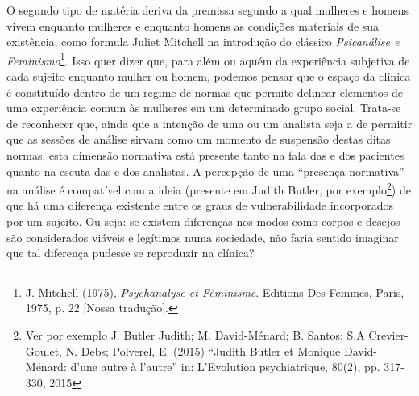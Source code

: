 O segundo tipo de matéria deriva da premissa segundo a qual mulheres e
homens vivem enquanto mulheres e enquanto homens as condições materiais
de sua existência, como formula Juliet Mitchell na introdução do
clássico \emph{Psicanálise e Feminismo}\footnote{J. Mitchell (1975),
  \emph{Psychanalyse et Féminisme}. Editions Des Femmes, Paris, 1975, p.
  22 {[}Nossa tradução{]}.}. Isso quer dizer que, para além ou aquém da
experiência subjetiva de cada sujeito enquanto mulher ou homem, podemos
pensar que o espaço da clínica é constituído dentro de um regime de
normas que permite delinear elementos de uma experiência comum às
mulheres em um determinado grupo social. Trata-se de reconhecer que,
ainda que a intenção de uma ou um analista seja a de permitir que as
sessões de análise sirvam como um momento de suspensão destas ditas
normas, esta dimensão normativa está presente tanto na fala das e dos
pacientes quanto na escuta das e dos analistas. A percepção de uma
``presença normativa'' na análise é compatível com a ideia (presente em
Judith Butler, por exemplo\footnote{Ver por exemplo J. Butler Judith; M.
  David-Ménard; B. Santos; S.A Crevier-Goulet, N. Debs; Polverel, E.
  (2015) ``Judith Butler et Monique David-Ménard: d'une autre à
  l'autre'' in: L'Evolution psychiatrique, 80(2), pp. 317-330, 2015}) de
que há uma diferença existente entre os graus de vulnerabilidade
incorporados por um sujeito. Ou seja: se existem diferenças nos modos
como corpos e desejos são considerados viáveis e legítimos numa
sociedade, não faria sentido imaginar que tal diferença pudesse se
reproduzir na clínica?

